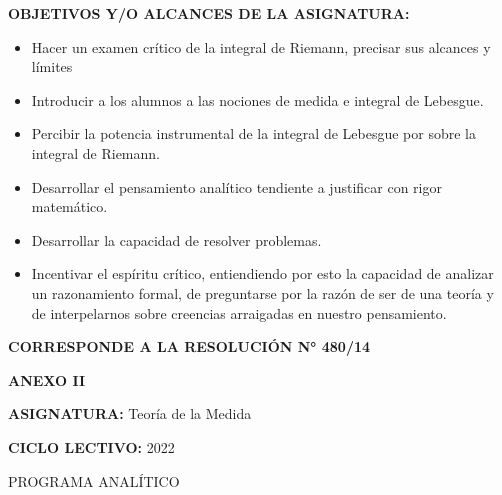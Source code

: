 \documentclass[a4paper, 12pt]{article}
\begin{document}
\textbf{OBJETIVOS Y/O ALCANCES DE LA ASIGNATURA:}
\begin{itemize} 
 \item Hacer un examen crítico de la integral de Riemann, precisar sus alcances y límites
 \item Introducir a los alumnos a las nociones de medida e integral de Lebesgue. 
 \item Percibir la potencia instrumental de la integral de Lebesgue por sobre la integral de Riemann.
 \item Desarrollar el pensamiento analítico tendiente a justificar con rigor matemático. 
 \item Desarrollar la capacidad de resolver problemas.
 \item Incentivar el espíritu crítico, entiendiendo por esto la capacidad  de analizar un razonamiento formal, de preguntarse por la razón de ser de una teoría y de interpelarnos sobre creencias arraigadas en nuestro pensamiento. 
\end{itemize}

\newpage






\begin{flushleft}
 \textbf{\large CORRESPONDE A LA RESOLUCIÓN N° 480/14}
\end{flushleft}


\begin{center}
 \textbf{\large ANEXO II}
\end{center}





 \textbf{ASIGNATURA:} Teoría de la Medida

 \textbf{CICLO LECTIVO:} 2022
 
  PROGRAMA ANALÍTICO
 
\end{document}
